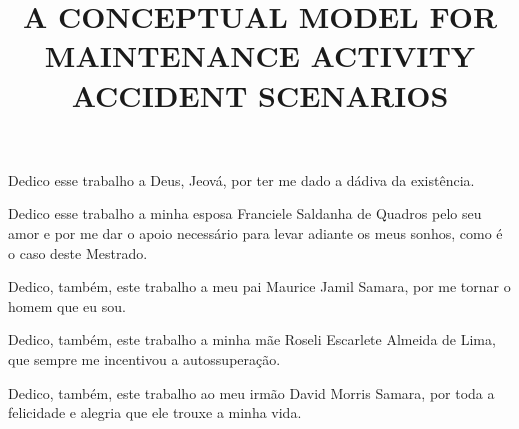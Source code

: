 \documentclass[openright]{normas-utf-tex} %
\title{\MakeUppercase{A Conceptual Model for Maintenance Activity Accident Scenarios}} %
\begin{document}
\capa %
\folhaderosto %

\fichacatpgbib{\pageref{bibstart}-\pageref{bibend}}
\fichacat


\begin{dedicatoria}
Dedico esse trabalho a Deus, Jeová, por ter me dado a dádiva da existência.

Dedico esse trabalho a minha esposa Franciele Saldanha de Quadros pelo seu amor e por me dar o apoio necessário para levar adiante os meus sonhos, como é o caso deste Mestrado. 

Dedico, também, este trabalho a meu pai Maurice Jamil Samara, por me tornar o homem que eu sou.

Dedico, também, este trabalho a minha mãe Roseli Escarlete Almeida de Lima, que sempre me incentivou a autossuperação.

Dedico, também, este trabalho ao meu irmão David Morris Samara, por toda a felicidade e alegria que ele trouxe a minha vida. 

\end{dedicatoria}
\end{document}
